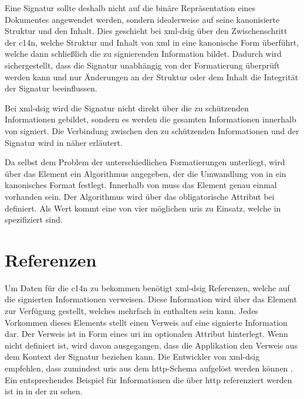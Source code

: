 Eine Signatur sollte deshalb nicht auf die binäre Repräsentation eines Dokumentes angewendet werden, sondern idealerweise auf seine kanonisierte
Struktur und den Inhalt. Dies geschieht bei \gls{xml-dsig} über den Zwischenschritt der \gls{c14n}, welche Struktur und Inhalt von \gls{xml} in eine kanonische 
Form überführt\cite{xml-c14n:w3c,xml-exc-c14n:w3c}, welche dann schließlich die zu signierenden Information bildet. Dadurch wird sichergestellt, dass die Signatur 
unabhängig von der Formatierung überprüft werden kann und nur Änderungen an der Struktur oder dem Inhalt die Integrität der Signatur beeinflussen. 

Bei \gls{xml-dsig} wird die Signatur nicht direkt über die zu schützenden Informationen gebildet, sondern es werden die gesamten Informationen innerhalb von
 signiert. Die Verbindung zwischen den zu schützenden Informationen und der Signatur wird in  näher erläutert.

Da  selbst dem Problem der unterschiedlichen Formatierungen unterliegt, wird über das Element  ein
Algorithmus angegeben, der die Umwandlung von  in ein kanonisches Format festlegt. Innerhalb von  muss das Element
 genau einmal vorhanden sein. Der Algorithmus wird über das obligatorische Attribut 
bei  definiert. Als Wert kommt eine von vier möglichen \glspl{uri} zu Einsatz, welche in \cite{xml-dsig:w3c} spezifiziert sind.

\section{Referenzen}
\label{sec:XML-DSig:Referenzen}
Um Daten für die \gls{c14n} zu bekommen benötigt \gls{xml-dsig} Referenzen, welche auf die signierten Informationen verweisen. Diese Information wird über das 
Element  zur Verfügung gestellt, welches mehrfach in  enthalten sein kann. Jedes Vorkommen dieses Elements stellt einen
Verweis auf eine signierte Information dar. Der Verweis ist in Form eines \gls{uri} im optionalen Attribut  hinterlegt. Wenn
 nicht definiert ist, wird davon ausgegangen, dass die Applikation den Verweis aus dem Kontext der Signatur beziehen kann. Die
Entwickler von \gls{xml-dsig} empfehlen, dass zumindest \glspl{uri} aus dem \gls{http}-Schema aufgelöst werden können \cite{xml-dsig:w3c}. Ein entsprechendes
Beispiel für Informationen die über \gls{http} referenziert werden ist in  in der
 zu sehen.

